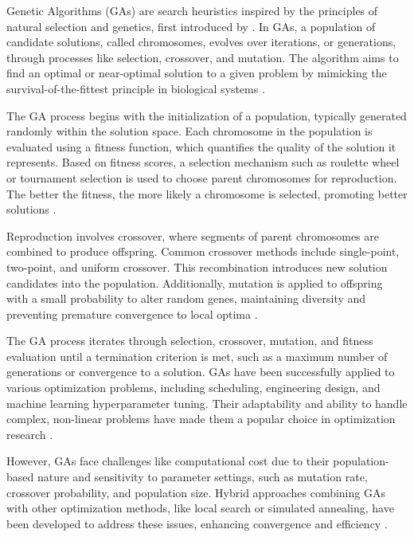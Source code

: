 Genetic Algorithms (GAs) are search heuristics inspired by the principles of natural selection and genetics, first introduced by \textcite{holland1975introductory}. In GAs, a population of candidate solutions, called chromosomes, evolves over iterations, or generations, through processes like selection, crossover, and mutation. The algorithm aims to find an optimal or near-optimal solution to a given problem by mimicking the survival-of-the-fittest principle in biological systems \parencite{mitchell1998introduction}.

The GA process begins with the initialization of a population, typically generated randomly within the solution space. Each chromosome in the population is evaluated using a fitness function, which quantifies the quality of the solution it represents. Based on fitness scores, a selection mechanism such as roulette wheel or tournament selection is used to choose parent chromosomes for reproduction. The better the fitness, the more likely a chromosome is selected, promoting better solutions \parencite{Kawachi1992goldberg}.

Reproduction involves crossover, where segments of parent chromosomes are combined to produce offspring. Common crossover methods include single-point, two-point, and uniform crossover. This recombination introduces new solution candidates into the population. Additionally, mutation is applied to offspring with a small probability to alter random genes, maintaining diversity and preventing premature convergence to local optima \parencite{de1975analysis}.

The GA process iterates through selection, crossover, mutation, and fitness evaluation until a termination criterion is met, such as a maximum number of generations or convergence to a solution. GAs have been successfully applied to various optimization problems, including scheduling, engineering design, and machine learning hyperparameter tuning. Their adaptability and ability to handle complex, non-linear problems have made them a popular choice in optimization research \parencite{whitley1994genetic}.

However, GAs face challenges like computational cost due to their population-based nature and sensitivity to parameter settings, such as mutation rate, crossover probability, and population size. Hybrid approaches combining GAs with other optimization methods, like local search or simulated annealing, have been developed to address these issues, enhancing convergence and efficiency \parencite{michalewicz2013genetic}.

